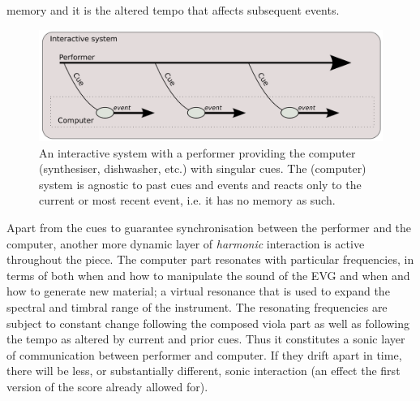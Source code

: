 memory and it is the altered tempo that affects subsequent events.

\begin{figure}
  \centering
  \includegraphics[width=0.95\linewidth]{img/serial}
  \caption[Scheme of a simple interactive system without memory.]{An interactive system with a performer providing the computer (synthesiser, dishwasher, etc.) with singular cues. The (computer) system is agnostic to past cues and events and reacts only to the current or most recent event, i.e. it has no memory as such.}
  \label{fig:serial}
\end{figure}
Apart from the cues to guarantee synchronisation between the performer and the computer, another more dynamic layer of \emph{harmonic} interaction is active throughout the piece. The computer part resonates with particular frequencies, in terms of both when and how to manipulate the sound of the EVG and when and how to generate new material; a virtual resonance that is used to expand the spectral and timbral range of the instrument. The resonating frequencies are subject to constant change following the composed viola part as well as following the tempo as altered by current and prior cues. Thus it constitutes a sonic layer of communication between performer and computer. If they drift apart in time, there will be less, or substantially different, sonic interaction (an effect the first version of the score already allowed for).

